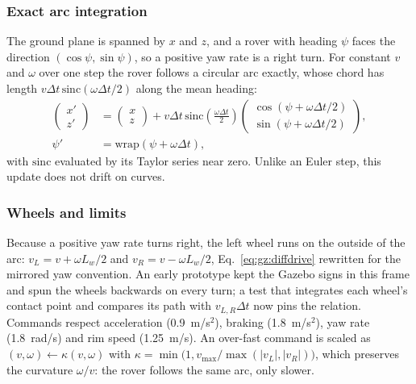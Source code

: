 \subsubsection{Exact arc integration} The ground plane is spanned by $x$ and
$z$, and a rover with heading $\psi$ faces the direction
$(\cos\psi,\sin\psi)$, so a positive yaw rate is a right turn. For constant $v$ and $\omega$ over one step the rover
follows a circular arc exactly, whose chord has length
$v\Delta t\,\mathrm{sinc}(\omega\Delta t/2)$ along the mean heading:
\begin{equation}
\begin{aligned}
\begin{pmatrix}x'\\z'\end{pmatrix}&=\begin{pmatrix}x\\z\end{pmatrix}
+v\Delta t\,\mathrm{sinc}\!\left(\tfrac{\omega\Delta t}{2}\right)
\begin{pmatrix}\cos(\psi+\omega\Delta t/2)\\ \sin(\psi+\omega\Delta t/2)\end{pmatrix},\\
\psi'&=\mathrm{wrap}(\psi+\omega\Delta t),
\end{aligned}
\label{eq:eng:arc}
\end{equation}
with $\mathrm{sinc}$ evaluated by its Taylor series near zero. Unlike an Euler
step, this update does not drift on curves.

\subsubsection{Wheels and limits} Because a positive yaw rate turns right,
the left wheel runs on the outside of the arc:
$v_L=v+\omega L_w/2$ and $v_R=v-\omega L_w/2$, Eq.~\eqref{eq:gz:diffdrive}
rewritten for the mirrored yaw convention. An early prototype kept the Gazebo
signs in this frame and spun the wheels backwards on every turn; a test that
integrates each wheel's contact point and compares its path with
$v_{L,R}\Delta t$ now pins the relation. Commands respect acceleration
(0.9~m/s$^2$), braking (1.8~m/s$^2$), yaw rate (1.8~rad/s) and rim speed
(1.25~m/s). An over-fast command is scaled as
$(v,\omega)\leftarrow\kappa(v,\omega)$ with
$\kappa=\min\bigl(1,v_{\max}/\max(|v_L|,|v_R|)\bigr)$, which preserves the
curvature $\omega/v$: the rover follows the same arc, only slower.

